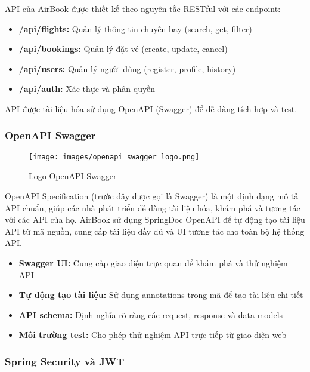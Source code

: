 API của AirBook được thiết kế theo nguyên tắc RESTful với các endpoint:

\begin{itemize}[leftmargin=1cm]
    \item \textbf{/api/flights:} Quản lý thông tin chuyến bay (search, get, filter)
    \item \textbf{/api/bookings:} Quản lý đặt vé (create, update, cancel)
    \item \textbf{/api/users:} Quản lý người dùng (register, profile, history)
    \item \textbf{/api/auth:} Xác thực và phân quyền
\end{itemize}

API được tài liệu hóa sử dụng OpenAPI (Swagger) để dễ dàng tích hợp và test.


\subsubsection{OpenAPI Swagger}

\begin{figure}[H]
\centering
\texttt{[image: images/openapi\_swagger\_logo.png]}
\caption{Logo OpenAPI Swagger}
\end{figure}

OpenAPI Specification (trước đây được gọi là Swagger) là một định dạng mô tả API chuẩn, giúp các nhà phát triển dễ dàng tài liệu hóa, khám phá và tương tác với các API của họ. AirBook sử dụng SpringDoc OpenAPI để tự động tạo tài liệu API từ mã nguồn, cung cấp tài liệu đầy đủ và UI tương tác cho toàn bộ hệ thống API.

\begin{itemize}[leftmargin=1cm]
    \item \textbf{Swagger UI:} Cung cấp giao diện trực quan để khám phá và thử nghiệm API
    \item \textbf{Tự động tạo tài liệu:} Sử dụng annotations trong mã để tạo tài liệu chi tiết
    \item \textbf{API schema:} Định nghĩa rõ ràng các request, response và data models
    \item \textbf{Môi trường test:} Cho phép thử nghiệm API trực tiếp từ giao diện web
\end{itemize}

\subsubsection{Spring Security và JWT}

